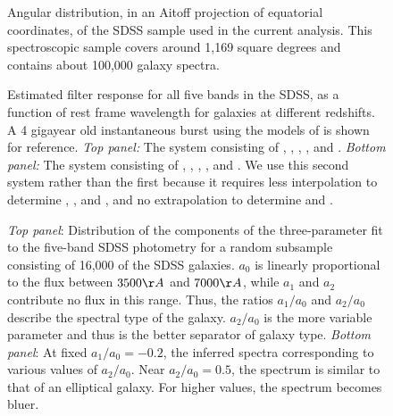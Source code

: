 \clearpage

\setcounter{thefigs}{0}

\clearpage
{}
\begin{figure}
\figurenum{\fignum}
\caption{\label{radec.sample8b} Angular distribution, in an Aitoff
projection of equatorial coordinates, of the SDSS sample used in the
current analysis. This spectroscopic sample covers around 1,169 square
degrees and contains about 100,000 galaxy spectra.}
\end{figure}

\clearpage
{}
\begin{figure}
\figurenum{\fignum}
\caption{\label{response_sdss} Estimated filter response for all five
bands in the SDSS, as a function of rest frame wavelength for galaxies
at different redshifts. A 4 gigayear old instantaneous burst using the
models of \citet{bruzual93a} is shown for reference. {\it Top panel:}
The system consisting of , , ,
, and .  {\it Bottom panel:} The system
consisting of , , ,
, and . We use this second system rather
than the first because it requires less interpolation to determine
, , and , and no extrapolation to
determine  and . }
\end{figure}

\clearpage
{}
\begin{figure}
\figurenum{\fignum}
\caption{\label{plotaij.sample8b15} {\it Top panel}: Distribution of
the components of the three-parameter fit to the five-band SDSS
photometry for a random subsample consisting of 16,000 of the SDSS
galaxies. $a_0$ is linearly proportional to the flux between $3500\AA$
and $7000\AA$, while $a_1$ and $a_2$ contribute no flux in this
range. Thus, the ratios $a_1/a_0$ and $a_2/a_0$ describe the spectral
type of the galaxy. $a_2/a_0$ is the more variable parameter and thus
is the better separator of galaxy type. {\it Bottom panel}: At fixed
$a_1/a_0=-0.2$, the inferred spectra corresponding to various values
of $a_2/a_0$. Near $a_2/a_0=0.5$, the spectrum is similar to that of
an elliptical galaxy. For higher values, the spectrum becomes bluer. }
\end{figure}

